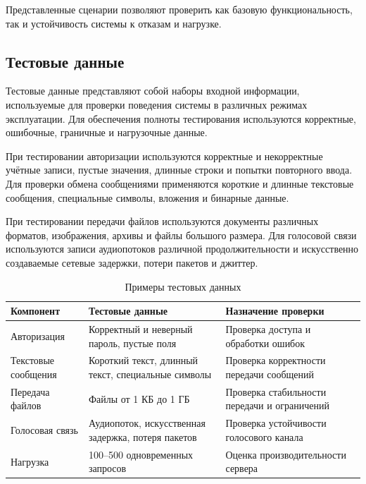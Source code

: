 \documentclass[14pt,a4paper]{extarticle}
\begin{document}
Представленные сценарии позволяют проверить как базовую функциональность, так и устойчивость системы к отказам и нагрузке.

\subsection{Тестовые данные}

Тестовые данные представляют собой наборы входной информации, используемые для проверки поведения системы в различных режимах эксплуатации. Для обеспечения полноты тестирования используются корректные, ошибочные, граничные и нагрузочные данные.

При тестировании авторизации используются корректные и некорректные учётные записи, пустые значения, длинные строки и попытки повторного ввода. Для проверки обмена сообщениями применяются короткие и длинные текстовые сообщения, специальные символы, вложения и бинарные данные.

При тестировании передачи файлов используются документы различных форматов, изображения, архивы и файлы большого размера. Для голосовой связи используются записи аудиопотоков различной продолжительности и искусственно создаваемые сетевые задержки, потери пакетов и джиттер.

\begin{table}[H]
\centering
\caption{Примеры тестовых данных}
\begin{tabular}{|p{3.5cm}|p{4.5cm}|p{5cm}|}
\hline
\textbf{Компонент} &
\textbf{Тестовые данные} &
\textbf{Назначение проверки} \\
\hline

Авторизация &
Корректный и неверный пароль, пустые поля &
Проверка доступа и обработки ошибок \\
\hline

Текстовые сообщения &
Короткий текст, длинный текст, специальные символы &
Проверка корректности передачи сообщений \\
\hline

Передача файлов &
Файлы от 1 КБ до 1 ГБ &
Проверка стабильности передачи и ограничений \\
\hline

Голосовая связь &
Аудиопоток, искусственная задержка, потеря пакетов &
Проверка устойчивости голосового канала \\
\hline

Нагрузка &
100–500 одновременных запросов &
Оценка производительности сервера \\
\hline

\end{tabular}
\end{table}
\end{document}
